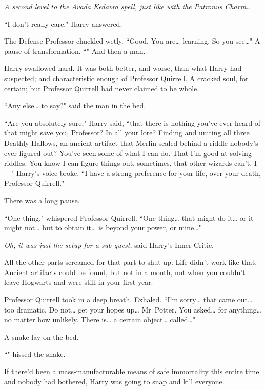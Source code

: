 \emph{A second level to the Avada Kedavra spell, just like with the Patronus Charm{\ldots}}

``I don't really care," Harry answered.

The Defense Professor chuckled wetly. ``Good. You are{\ldots} learning. So you see{\ldots}" A pause of transformation. ``" And then a man.

Harry swallowed hard. It was both better, and worse, than what Harry had suspected; and characteristic enough of Professor Quirrell. A cracked soul, for certain; but Professor Quirrell had never claimed to be whole.

``Any else{\ldots} to say?" said the man in the bed.

``Are you absolutely sure," Harry said, ``that there is nothing you've ever heard of that might save you, Professor? In all your lore? Finding and uniting all three Deathly Hallows, an ancient artifact that Merlin sealed behind a riddle nobody's ever figured out? You've seen some of what I can do. That I'm good at solving riddles. You know I can figure things out, sometimes, that other wizards can't. I—" Harry's voice broke. ``I have a strong preference for your life, over your death, Professor Quirrell."

There was a long pause.

``One thing," whispered Professor Quirrell. ``One thing{\ldots} that might do it{\ldots} or it might not{\ldots} but to obtain it{\ldots} is beyond your power, or mine{\ldots}"

\emph{Oh, it was just the setup for a sub-quest,} said Harry's Inner Critic.

All the other parts screamed for that part to shut up. Life didn't work like that. Ancient artifacts could be found, but not in a month, not when you couldn't leave Hogwarts and were still in your first year.

Professor Quirrell took in a deep breath. Exhaled. ``I'm sorry{\ldots} that came out{\ldots} too dramatic. Do not{\ldots} get your hopes up{\ldots} Mr~Potter. You asked{\ldots} for anything{\ldots} no matter how unlikely. There is{\ldots} a certain object{\ldots} called{\ldots}"

A snake lay on the bed.

``" hissed the snake.

If there'd been a mass-manufacturable means of safe immortality this entire time and nobody had bothered, Harry was going to snap and kill everyone.

